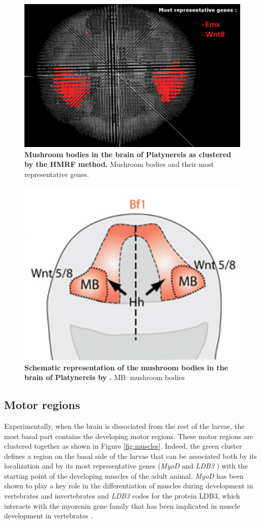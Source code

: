 	\begin{figure}[H]
\centerline{\includegraphics[width=0.8\linewidth]{gfx/chapter6/mush.png}}
\caption{{\bf Mushroom bodies in the brain of Platynereis as clustered by the HMRF method.} Mushroom bodies and their most representative genes.}
\label{fig:validmush}
	\end{figure}
	
	\begin{figure}[H]
\centerline{\includegraphics[width=0.6\linewidth]{gfx/chapter6/mush_tomer.png}}
\caption{{\bf Schematic representation of the mushroom bodies in the brain of Platynereis by \cite{Tomer10}.} MB: mushroom bodies}
\label{fig:validmushtom}
	\end{figure}
		\subsection{Motor regions}
		Experimentally, when the brain is dissociated from the rest of the larvae, the most basal part contains the developing motor regions. These motor regions are clustered together as shown in Figure \ref{fig:muscles}. Indeed, the green cluster defines a region on the basal side of the larvae that can be associated both by its localization and by its most representative genes ({\it{MyoD}} \cite{weintraub91,michelson90} and {\it{LDB3}} \cite{krcmery10,marziliano07}) with the starting point of the developing muscles of the adult animal. {\it{MyoD}} has been shown to play a key role in the differentiation of muscles during development in vertebrates and invertebrates \cite{weintraub91,michelson90} and {\it{LDB3}} codes for the protein LDB3, which interacts with the myozenin gene family that has been implicated in muscle development in vertebrates \cite{marziliano07}.\\
		
